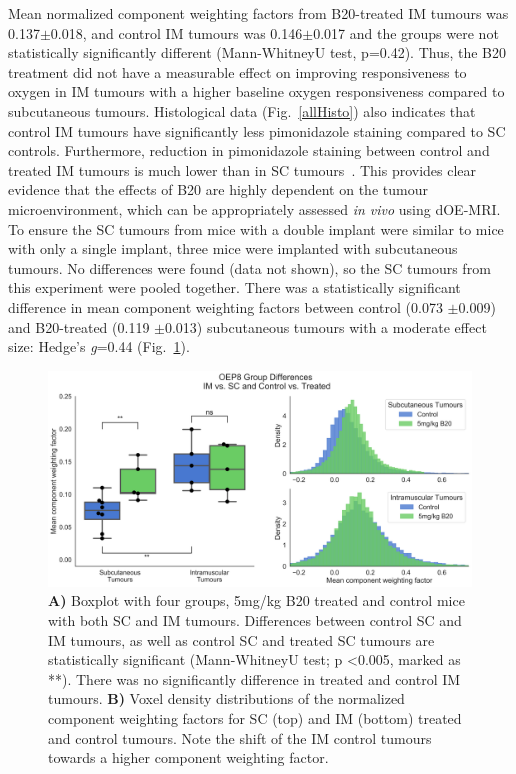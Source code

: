\documentclass[num-refs]{wiley-article}
\begin{document}
Mean normalized component weighting factors from B20-treated IM tumours was 0.137$\pm$0.018, and control IM tumours was 0.146$\pm$0.017 and the groups were not statistically significantly different (Mann-WhitneyU test, p=0.42). 
Thus, the B20 treatment did not have a measurable effect on improving responsiveness to oxygen in IM tumours with a higher baseline oxygen responsiveness compared to subcutaneous tumours.
Histological data (Fig.~\ref{allHisto}) also indicates that control IM tumours have significantly less pimonidazole staining compared to SC controls.
Furthermore, reduction in pimonidazole staining between control and treated IM tumours is much lower than in SC tumours~. 
This provides clear evidence that the effects of B20 are highly dependent on the tumour microenvironment, which can be appropriately assessed \emph{in vivo} using dOE-MRI.
To ensure the SC tumours from mice with a double implant were similar to mice with only a single implant, three mice were implanted with subcutaneous tumours.
No differences were found (data not shown), so the SC tumours from this experiment were pooled together.
There was a statistically significant difference in mean component weighting factors between control (0.073 $\pm$0.009) and B20-treated (0.119 $\pm$0.013) subcutaneous tumours with a moderate effect size: Hedge's \emph{g}=0.44 (Fig.~\ref{OEP8boxplot}).

\begin{figure}[htbp]
   \centering
   \includegraphics[width=\textwidth]{images/4_oep8_IMSC_b20_sanitized_dOEMRI.png} %
   \caption{\textbf{A)} Boxplot with four groups, 5mg/kg B20 treated and control mice with both SC and IM tumours.
   Differences between control SC and IM tumours, as well as control SC and treated SC tumours are statistically significant (Mann-WhitneyU test; p <0.005, marked as **).
   There was no significantly difference in treated and control IM tumours.
   \textbf{B)} Voxel density distributions of the normalized component weighting factors for SC (top) and IM (bottom) treated and control tumours.
   Note the shift of the IM control tumours towards a higher component weighting factor.}
   \label{OEP8boxplot}
\end{figure}
\end{document}
